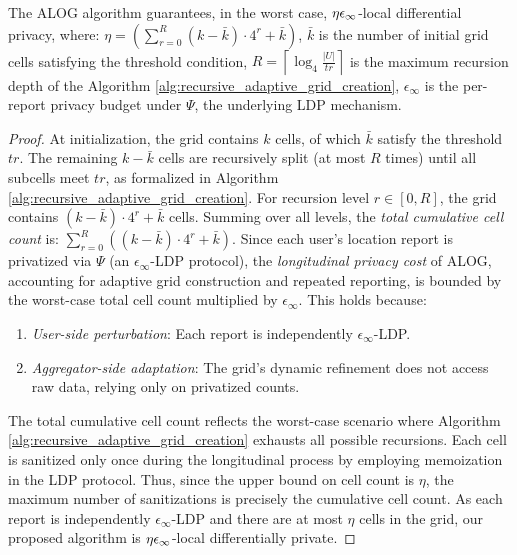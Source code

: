 \begin{proposition}
    The ALOG algorithm guarantees, in the worst case,  
    \(\eta \epsilon_\infty\)-local differential privacy, where: 
        \(\eta = \left( \sum_{r=0}^R (k - \bar{k}) \cdot 4^r + \bar{k} \right)\),
        \( \bar{k} \) is the number of initial grid cells satisfying the threshold condition,
        \( R = \left\lceil \log_4 \frac{|U|}{tr} \right\rceil \) is the maximum recursion depth of the Algorithm \ref{alg:recursive_adaptive_grid_creation},
        \( \epsilon_\infty \) is the per-report privacy budget under \( \Psi \), the underlying LDP mechanism.  
    \label{prop:alogdp}
\end{proposition}
\begin{proof}
    At initialization, the grid contains \( k \) cells, of which \( \bar{k} \) satisfy the threshold \( tr \). The remaining \( k - \bar{k} \) cells are recursively split (at most \( R \) times) until all subcells meet \( tr \), as formalized in Algorithm \ref{alg:recursive_adaptive_grid_creation}. 
    For recursion level \( r \in [0, R] \), the grid contains \( (k - \bar{k}) \cdot 4^r + \bar{k} \) cells. Summing over all levels, the \textit{total cumulative cell count} is:  
    \( 
    \sum_{r=0}^R \left( (k - \bar{k}) \cdot 4^r + \bar{k} \right).  
    \) 
    Since each user’s location report is privatized via \( \Psi \) (an \( \epsilon_\infty \)-LDP protocol), the \textit{longitudinal privacy cost} of ALOG, accounting for adaptive grid construction and repeated reporting, is bounded by the worst-case total cell count multiplied by \( \epsilon_\infty \). This holds because:
    \begin{enumerate}
        \item \textit{User-side perturbation}: Each report is independently \( \epsilon_\infty \)-LDP.
        \item \textit{Aggregator-side adaptation}: The grid’s dynamic refinement does not access raw data, relying only on privatized counts.
    \end{enumerate}
    The total cumulative cell count reflects the worst-case scenario where Algorithm \ref{alg:recursive_adaptive_grid_creation} exhausts all possible recursions. Each cell is sanitized only once during the longitudinal process by employing memoization in the LDP protocol. Thus, since the upper bound on cell count is \( \eta \), the maximum number of sanitizations is precisely the cumulative cell count.
    As each report is independently \( \epsilon_\infty \)-LDP and there are at most \(\eta\) cells in the grid, our proposed algorithm is \(\eta \epsilon_\infty\)-local differentially private.
\end{proof}


